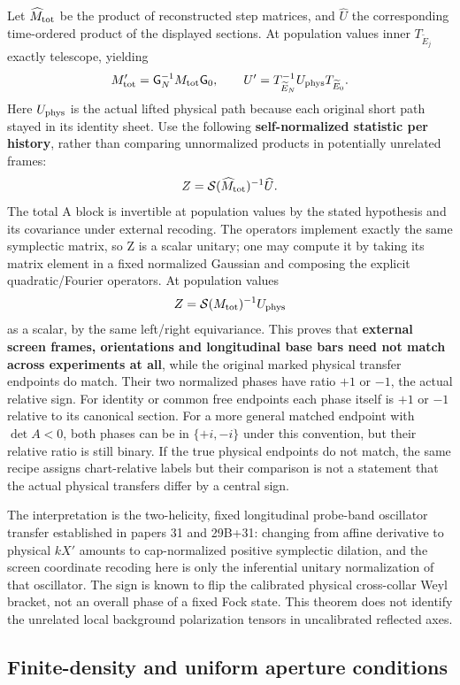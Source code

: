 \documentclass[11pt]{article}
\begin{document}
Let \(\widehat M_{\rm tot}\) be the product of reconstructed step matrices, and \(\widehat U\) the corresponding time-ordered product of the displayed sections. At population values inner \(T_{\widetilde E_j}\) exactly telescope, yielding
\[
 M'_{\rm tot}=\mathsf G_N^{-1}M_{\rm tot}\mathsf G_0,\qquad
 U'=T_{\widetilde E_N}^{-1}U_{\rm phys}T_{\widetilde E_0}.
\]
Here \(U_{\rm phys}\) is the actual lifted physical path because each original short path stayed in its identity sheet. Use the following \textbf{self-normalized statistic per history}, rather than comparing unnormalized products in potentially unrelated frames:
\[
 Z=\mathcal S(\widehat M_{\rm tot})^{-1}\widehat U .
\]
The total A block is invertible at population values by the stated hypothesis and its covariance under external recoding. The operators implement exactly the same symplectic matrix, so Z is a scalar unitary; one may compute it by taking its matrix element in a fixed normalized Gaussian and composing the explicit quadratic/Fourier operators. At population values
\[
 Z=\mathcal S(M_{\rm tot})^{-1} U_{\rm phys}
\]
as a scalar, by the same left/right equivariance. This proves that \textbf{external screen frames, orientations and longitudinal base bars need not match across experiments at all}, while the original marked physical transfer endpoints do match. Their two normalized phases have ratio \(+1\) or \(-1\), the actual relative sign. For identity or common free endpoints each phase itself is \(+1\) or \(-1\) relative to its canonical section. For a more general matched endpoint with \(\det A<0\), both phases can be in \(\{+i,-i\}\) under this convention, but their relative ratio is still binary. If the true physical endpoints do not match, the same recipe assigns chart-relative labels but their comparison is not a statement that the actual physical transfers differ by a central sign.

The interpretation is the two-helicity, fixed longitudinal probe-band oscillator transfer established in papers 31 and 29B+31: changing from affine derivative to physical \(kX'\) amounts to cap-normalized positive symplectic dilation, and the screen coordinate recoding here is only the inferential unitary normalization of that oscillator. The sign is known to flip the calibrated physical cross-collar Weyl bracket, not an overall phase of a fixed Fock state. This theorem does not identify the unrelated local background polarization tensors in uncalibrated reflected axes.

\subsection{Finite-density and uniform aperture conditions}\label{finite-density-and-uniform-aperture-conditions}
\end{document}
